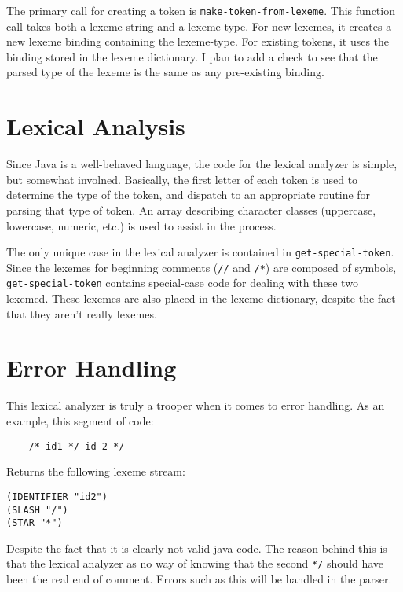 \documentclass{article}[1994/05/24]
\begin{document}
	The primary call for creating a token is
\verb|make-token-from-lexeme|.  This function call takes both a
lexeme string and a lexeme type.  For new lexemes, it creates a
new lexeme binding containing the lexeme-type.  For existing
tokens, it uses the binding stored in the lexeme dictionary. I
plan to add a check to see that the parsed type of the lexeme is
the same as any pre-existing binding.

\section{Lexical Analysis}

	Since Java is a well-behaved language, the code for the
lexical analyzer is simple, but somewhat involned.  Basically, the
first letter of each token is used to determine the type of the
token, and dispatch to an appropriate routine for parsing that
type of token. An array describing character classes (uppercase,
lowercase, numeric, etc.) is used to assist in the process.

	The only unique case in the lexical analyzer is contained
in \verb|get-special-token|. Since the lexemes for beginning
comments (\verb|//| and \verb|/*|) are composed of symbols,
\verb|get-special-token| contains special-case code for dealing
with these two lexemed. These lexemes are also placed in the
lexeme dictionary, despite the fact that they aren't really
lexemes.

\section{Error Handling}


	This lexical analyzer is truly a trooper when it comes to
error handling.  As an example, this segment of code:

\begin{verbatim}
	/* id1 */ id 2 */
\end{verbatim}

Returns the following lexeme stream:

\begin{verbatim}
(IDENTIFIER "id2")
(SLASH "/")
(STAR "*")
\end{verbatim}

Despite the fact that it is clearly not valid java code.  The
reason behind this is that the lexical analyzer as no way of
knowing that the second \verb|*/| should have been the real end of
comment. Errors such as this will be handled in the parser.
\end{document}
